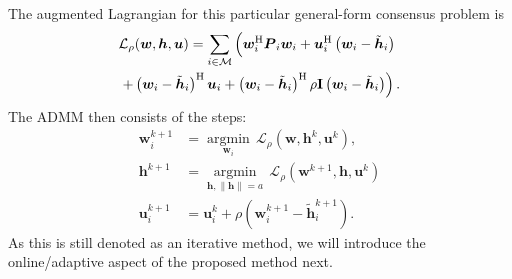 \documentclass{article}
\newcommand{\hf}{{\bm{h}}}
\newcommand{\wf}{{\bm{w}}}
\newcommand{\uuf}{{\bm{u}}}
\newcommand{\aRhof}{{\bm{{P}}}}
\newcommand{\I}{\mtxb{I}}
\newcommand{\Mset}{\mathcal{M}}
\begin{document}
The augmented Lagrangian for this particular general-form consensus problem is
\begin{align}
    &\mathcal{L}_{\rho} (\wf,\hf,\uuf) = \sum_{i \in \Mset} \left( \wf_i^\herm \aRhof_i \wf_i + \uuf_i^{\herm} \left(\wf_i - \tilde{\hf}_i\right)\vphantom{+ \frac{\rho}{2} \left\| \wf_i - \tilde{\hf}_i \right\|^2} \right.\nonumber\\
    &\left. + \left(\wf_i - \tilde{\hf}_i\right)^\herm \uuf_i + \left( \wf_i - \tilde{\hf}_i \right)^\herm \rho \I \left( \wf_i - \tilde{\hf}_i \right) \right).\label{eq:general_consensus_admm:lagrangian}
\end{align}
The ADMM then consists of the steps:
\begin{align}
    \wf_i^{k+1} &= \underset{\wf_i}{\operatorname{argmin}} \, \mathcal{L}_{\rho} (\wf,\hf^k,\uuf^k),\label{eq:general_consensus_admm:local}\\
    \hf^{k+1} &= \underset{\hf, \|\hf\| = a}{\operatorname{argmin}}\, \mathcal{L}_{\rho} (\wf^{k+1},\hf,\uuf^k)\label{eq:general_consensus_admm:global}\\
    \uuf_i^{k+1} &= \uuf_i^{k} + \rho \left( \wf_i^{k+1} - \tilde{\hf}_i^{k+1} \right).\label{eq:general_consensus_admm:dual}
\end{align}
As this is still denoted as an iterative method, we will introduce the online/adaptive aspect of the proposed method next.
\end{document}
